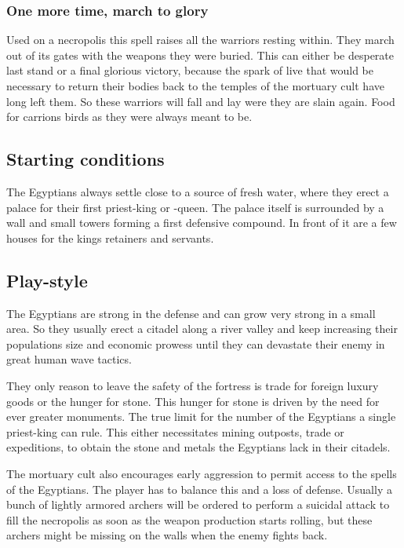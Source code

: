 \documentclass[a4paper]{book}
\begin{document}
\subsubsection{One more time, march to glory}
Used on a necropolis this spell raises all the warriors resting within. They
march out of its gates with the weapons they were buried. This can either be
desperate last stand or a final glorious victory, because the spark of live
that would be necessary to return their bodies back to the temples of the
mortuary cult have long left them. So these warriors will fall and lay were
they are slain again. Food for carrions birds as they were always meant to be.

\subsection{Starting conditions}
The \gls{Egyptians} always settle close to a source of fresh water, where they
erect a palace for their first priest-king or -queen. The palace itself is
surrounded by a wall and small towers forming a first defensive compound. In
front of it are a few houses for the kings retainers and servants.

\subsection{Play-style}
The \gls{Egyptians} are strong in the defense and can grow very strong in a
small area. So they usually erect a citadel along a river valley and keep
increasing their populations size and economic prowess until they can devastate
their enemy in great human wave tactics.

They only reason to leave the safety of the fortress is trade for foreign
luxury goods or the hunger for stone. This hunger for stone is driven by the
need for ever greater monuments. The true limit for the number of the
\gls{Egyptians} a single priest-king can rule. This either necessitates mining
outposts, trade or expeditions, to obtain the stone and metals the
\gls{Egyptians} lack in their citadels.

The mortuary cult also encourages early aggression to permit access to the
spells of the \gls{Egyptians}. The player has to balance this and a loss of
defense. Usually a bunch of lightly armored archers will be ordered to perform
a suicidal attack to fill the necropolis as soon as the weapon production
starts rolling, but these archers might be missing on the walls when the enemy
fights back.
\end{document}
